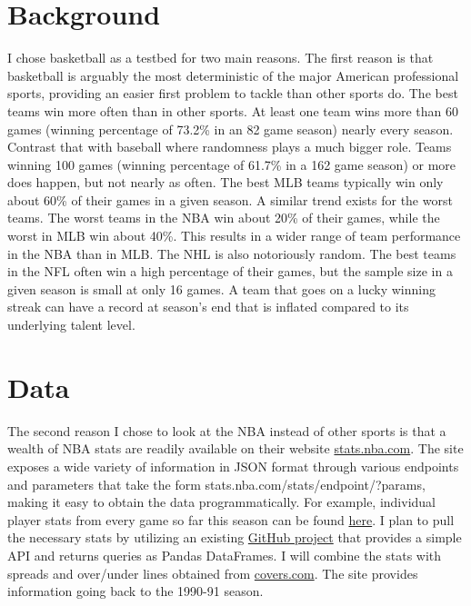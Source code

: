 \documentclass{article}
\begin{document}
\section{Background}
I chose basketball as a testbed for two main reasons. The first reason is that basketball is arguably the most deterministic of the major American professional sports, providing an easier first problem to tackle than other sports do. The best teams win more often than in other sports. At least one team wins more than 60 games (winning percentage of 73.2\% in an 82 game season) nearly every season. Contrast that with baseball where randomness plays a much bigger role. Teams winning 100 games (winning percentage of 61.7\% in a 162 game season) or more does happen, but not nearly as often. The best MLB teams typically win only about 60\% of their games in a given season. A similar trend exists for the worst teams. The worst teams in the NBA win about 20\% of their games, while the worst in MLB win about 40\%. This results in a wider range of team performance in the NBA than in MLB. The NHL is also notoriously random. The best teams in the NFL often win a high percentage of their games, but the sample size in a given season is small at only 16 games. A team that goes on a lucky winning streak can have a record at season's end that is inflated compared to its underlying talent level.
\section{Data}
The second reason I chose to look at the NBA instead of other sports is that a wealth of NBA stats are readily available on their website \url{stats.nba.com}. The site exposes a wide variety of information in JSON format through various endpoints and parameters that take the form stats.nba.com/stats/{endpoint}/?{params}, making it easy to obtain the data programmatically. For example, individual player stats from every game so far this season can be found \href{http://stats.nba.com/stats/leaguegamelog/?LeagueID=00&Season=2016-17&SeasonType=Regular\%20Season&PlayerOrTeam=P&Sorter=PTS&Direction=DESC}{here}. I plan to pull the necessary  stats by utilizing an existing \href{https://github.com/seemethere/nba_py}{GitHub project} that provides a simple API and returns queries as Pandas DataFrames. I will combine the stats with spreads and over/under lines obtained from \url{covers.com}. The site provides information going back to the 1990-91 season.
\end{document}
